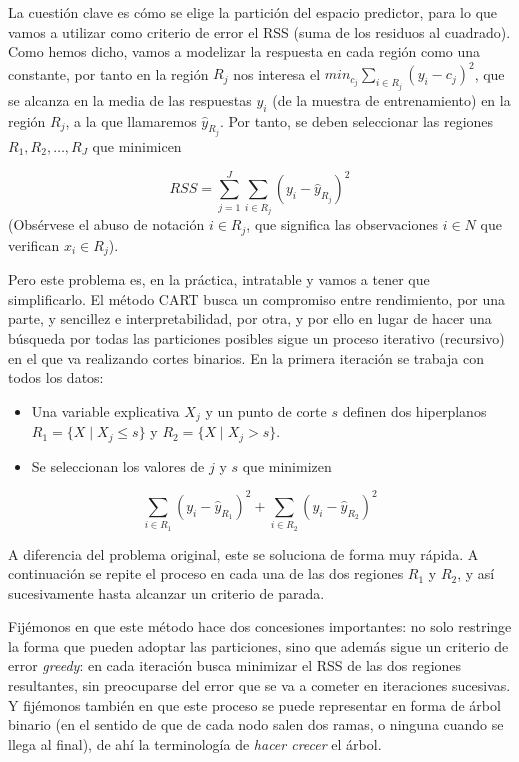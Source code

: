 \documentclass[
  spanish,
]{book}
\theoremstyle{break}
\theoremstyle{definition}
\theoremstyle{definition}
\theoremstyle{definition}
\theoremstyle{remark}
\begin{document}
La cuestión clave es cómo se elige la partición del espacio predictor, para lo
que vamos a utilizar como criterio de error el RSS (suma de los residuos al cuadrado).
Como hemos dicho, vamos a modelizar la respuesta en cada región como una constante,
por tanto en la región \(R_j\) nos interesa el
\(min_{c_j} \sum_{i\in R_j} (y_i - c_j)^2\), que se alcanza en la media de las
respuestas \(y_i\) (de la muestra de entrenamiento) en la región \(R_j\),
a la que llamaremos \(\widehat y_{R_j}\).
Por tanto, se deben seleccionar las regiones \(R_1, R_2, \ldots, R_J\) que minimicen

\[RSS = \sum_{j=1}^{J} \sum_{i\in R_j} (y_i - \widehat y_{R_j})^2\]
(Obsérvese el abuso de notación \(i\in R_j\), que significa las observaciones
\(i\in N\) que verifican \(x_i \in R_j\)).

Pero este problema es, en la práctica, intratable y vamos a tener que simplificarlo.
El método CART busca un compromiso
entre rendimiento, por una parte, y sencillez e interpretabilidad, por otra, y por ello
en lugar de hacer una búsqueda por todas las particiones posibles sigue un proceso
iterativo (recursivo) en el que va realizando cortes binarios. En la primera iteración
se trabaja con todos los datos:

\begin{itemize}
\item
  Una variable explicativa \(X_j\) y un punto de corte \(s\) definen dos hiperplanos
  \(R_1 = \{ X \mid X_j \le s \}\) y \(R_2 = \{ X \mid X_j > s \}\).
\item
  Se seleccionan los valores de \(j\) y \(s\) que minimizen
\end{itemize}

\[ \sum_{i\in R_1} (y_i - \widehat y_{R_1})^2 + \sum_{i\in R_2} (y_i - \widehat y_{R_2})^2\]

A diferencia del problema original, este se soluciona de forma muy rápida. A continuación
se repite el proceso en cada una de las dos regiones \(R_1\) y \(R_2\), y así sucesivamente
hasta alcanzar un criterio de parada.

Fijémonos en que este método hace dos concesiones importantes: no solo restringe la forma
que pueden adoptar las particiones, sino que además sigue un criterio de error \emph{greedy}:
en cada iteración busca minimizar el RSS de las dos regiones resultantes, sin preocuparse
del error que se va a cometer en iteraciones sucesivas. Y fijémonos también en que este
proceso se puede representar en forma de árbol binario (en el sentido de que de cada nodo
salen dos ramas, o ninguna cuando se llega al final), de ahí la terminología de \emph{hacer
crecer} el árbol.
\end{document}
